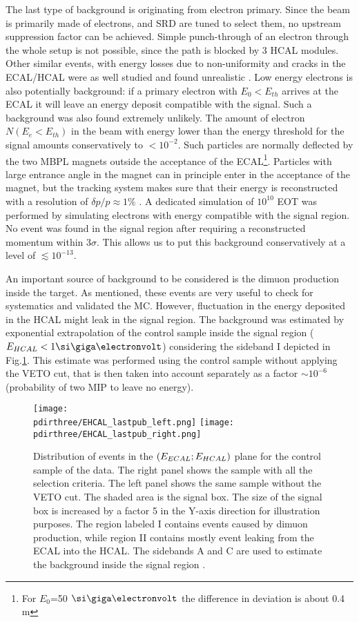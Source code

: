 The last type of background is originating from electron primary. Since the beam is primarily made of electrons, and SRD are tuned to select them, no upstream suppression factor can be achieved. Simple punch-through of an electron through the whole setup is not possible, since the path is blocked by 3 HCAL modules. Other similar events, with energy losses due to non-uniformity and cracks in the ECAL/HCAL were as well studied and found unrealistic \cite{Andreas:2013lya}. Low energy electrons is also potentially background: if a primary electron with $E_0 < E_{th}$ arrives at the ECAL it will leave an energy deposit compatible with the signal. Such a background was also found extremely unlikely. The amount of electron $N(E_e<E_{th})$ in the beam with energy lower than the energy threshold for the signal amounts conservatively to $<10^{-2}$. Such particles are normally deflected by the two MBPL magnets outside the acceptance of the ECAL\footnote{For $E_0$=50 $\gev$ the difference in deviation is about 0.4 \si{\meter}}. Particles with large entrance angle in the magnet can in principle enter in the acceptance of the magnet, but the tracking system makes sure that their energy is reconstructed with a resolution of $\delta p/p \approx 1\%$ \cite{Banerjee:2017mdu}. A dedicated simulation of $10^{10}$ EOT was performed by simulating electrons with energy compatible with the signal region. No event was found in the signal region after requiring a reconstructed momentum within 3$\sigma$. This allows us to put this background conservatively at a level of $\lesssim 10^{-13}$.

An important source of background to be considered is the dimuon production inside the target. As mentioned, these events are very useful to check for systematics and validated the MC. However, fluctuation in the energy deposited in the HCAL might leak in the signal region. The background was estimated by exponential extrapolation of the control sample inside the signal region ($E_{HCAL} < 1 \gev$) considering the sideband I depicted in Fig.\ref{fig:ehcal-bkg-bands}. This estimate was performed using the control sample without applying the VETO cut, that is then taken into account separately as a factor $\sim 10^{-6}$ (probability of two MIP to leave no energy).

\begin{figure}[bth!]
  \centering
  \texttt{[image: \\pdirthree/EHCAL\_lastpub\_left.png]}
  \texttt{[image: \\pdirthree/EHCAL\_lastpub\_right.png]}
  \caption[ECAL vs HCAL events band]{Distribution of events in the $(E_{ECAL};E_{HCAL})$ plane for the control sample of the data. The right panel shows the sample with all the selection criteria. The left panel shows the same sample without the VETO cut. The shaded area is the signal box. The size of the signal box is increased by a factor 5 in the Y-axis direction for illustration purposes. The region labeled I contains events caused by dimuon production, while region II contains mostly event leaking from the ECAL into the HCAL. The sidebands A and C are used to estimate the background inside the signal region \cite{NA64:2019imj}.}
  \label{fig:ehcal-bkg-bands}
\end{figure}

